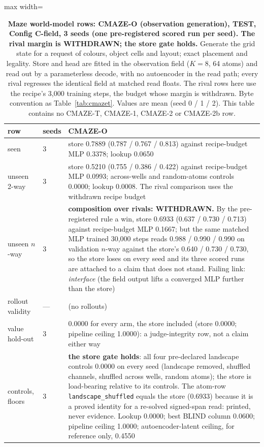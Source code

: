 \documentclass{article} %
\begin{document}
\begin{table}[h]
\centering\scriptsize
\caption{\textbf{Maze world-model rows: CMAZE-O (observation generation), TEST, Config C-field, 3 %
seeds (one pre-registered scored run per seed). The rival margin is WITHDRAWN; the store gate holds.} Generate
the grid state for a request of colours, object cells and layout; exact placement and legality.
Store and head are fitted in the observation field ($K=8$, 64 atoms) and read out by a parameterless %
decode, with no autoencoder in the read path; every rival regresses the identical field at matched
read floats. The rival rows here use the recipe's 3,000 training steps, the budget whose margin is %
withdrawn. Byte convention as Table~\ref{tab:cmazet}. Values are mean (seed 0 / 1 / 2). This table
contains no CMAZE-T, CMAZE-1, CMAZE-2 or CMAZE-2b row.}
\label{tab:cmazeo}
\setlength{\tabcolsep}{2pt}
\begin{adjustbox}{max width=\linewidth}\begin{tabular}{p{1.9cm}p{1.2cm}p{10.0cm}}
\toprule
row & seeds & CMAZE-O \\
\midrule
seen & 3 & store 0.7889 (0.787 / 0.767 / 0.813) against recipe-budget MLP 0.3378; lookup 0.0650 \\
unseen 2-way & 3 & store 0.5210 (0.755 / 0.386 / 0.422) against recipe-budget MLP 0.0993; across-wells and random-atoms controls 0.0000; lookup 0.0008. The rival comparison uses the withdrawn recipe budget \\
unseen $n$-way & 3 & \textbf{composition over rivals: WITHDRAWN.} By the pre-registered rule a win, store 0.6933 (0.637 / 0.730 / 0.713) against recipe-budget MLP 0.1667; but the same matched MLP trained 30,000 steps reads 0.988 / 0.990 / 0.990 on validation $n$-way against the store's 0.640 / 0.730 / 0.730, so the store loses on every seed and its three scored runs are attached to a claim that does not stand. Failing link: \emph{interface} (the field output lifts a converged MLP further than the store) \\
rollout validity & --- & (no rollouts) \\
value hold-out & 3 & 0.0000 for every arm, the store included (store 0.0000; pipeline ceiling 1.0000): a judge-integrity row, not a claim either way \\
controls, floors & 3 & \textbf{the store gate holds}: all four pre-declared landscape controls 0.0000 on every seed (landscape removed, shuffled channels, shuffled across wells, random atoms); the store is load-bearing relative to its controls. The atom-row \texttt{landscape\_shuffled} equals the store (0.6933) because it is a proved identity for a re-solved signed-span read: printed, never evidence. Lookup 0.0000; best BLIND column 0.0600; pipeline ceiling 1.0000; autoencoder-latent ceiling, for reference only, 0.4550 \\

\end{tabular}
\end{adjustbox}
\end{table}
\end{document}
